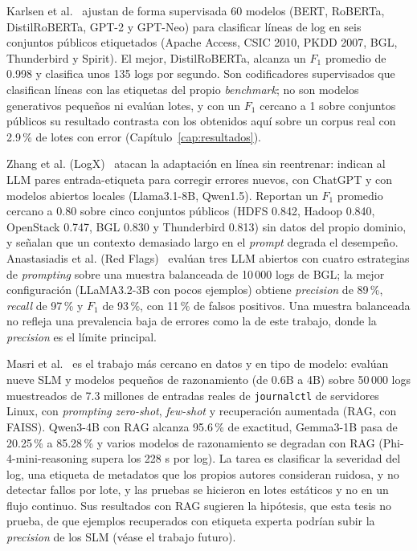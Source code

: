 Karlsen et al.~\cite{karlsen2024_benchmark} ajustan de forma supervisada 60 modelos (BERT, RoBERTa, DistilRoBERTa, GPT-2 y GPT-Neo) para clasificar líneas de log en seis conjuntos públicos etiquetados (Apache Access, CSIC 2010, PKDD 2007, BGL, Thunderbird y Spirit). El mejor, DistilRoBERTa, alcanza un $F_1$ promedio de 0.998 y clasifica unos 135 logs por segundo. Son codificadores supervisados que clasifican líneas con las etiquetas del propio \textit{benchmark}; no son modelos generativos pequeños ni evalúan lotes, y con un $F_1$ cercano a 1 sobre conjuntos públicos su resultado contrasta con los obtenidos aquí sobre un corpus real con 2.9\,\% de lotes con error (Capítulo~\ref{cap:resultados}).

Zhang et al. (LogX)~\cite{zhang2024_logx} atacan la adaptación en línea sin reentrenar: indican al LLM pares entrada-etiqueta para corregir errores nuevos, con ChatGPT y con modelos abiertos locales (Llama3.1-8B, Qwen1.5). Reportan un $F_1$ promedio cercano a 0.80 sobre cinco conjuntos públicos (HDFS 0.842, Hadoop 0.840, OpenStack 0.747, BGL 0.830 y Thunderbird 0.813) sin datos del propio dominio, y señalan que un contexto demasiado largo en el \textit{prompt} degrada el desempeño. Anastasiadis et al. (Red Flags)~\cite{anastasiadis2026_redflags} evalúan tres LLM abiertos con cuatro estrategias de \textit{prompting} sobre una muestra balanceada de 10\,000 logs de BGL; la mejor configuración (LLaMA3.2-3B con pocos ejemplos) obtiene \textit{precision} de 89\,\%, \textit{recall} de 97\,\% y $F_1$ de 93\,\%, con 11\,\% de falsos positivos. Una muestra balanceada no refleja una prevalencia baja de errores como la de este trabajo, donde la \textit{precision} es el límite principal.

Masri et al.~\cite{masri2026_slm_severity} es el trabajo más cercano en datos y en tipo de modelo: evalúan nueve SLM y modelos pequeños de razonamiento (de 0.6B a 4B) sobre 50\,000 logs muestreados de 7.3 millones de entradas reales de \texttt{journalctl} de servidores Linux, con \textit{prompting} \textit{zero-shot}, \textit{few-shot} y recuperación aumentada (RAG, con FAISS). Qwen3-4B con RAG alcanza 95.6\,\% de exactitud, Gemma3-1B pasa de 20.25\,\% a 85.28\,\% y varios modelos de razonamiento se degradan con RAG (Phi-4-mini-reasoning supera los 228 s por log). La tarea es clasificar la severidad del log, una etiqueta de metadatos que los propios autores consideran ruidosa, y no detectar fallos por lote, y las pruebas se hicieron en lotes estáticos y no en un flujo continuo. Sus resultados con RAG sugieren la hipótesis, que esta tesis no prueba, de que ejemplos recuperados con etiqueta experta podrían subir la \textit{precision} de los SLM (véase el trabajo futuro).

